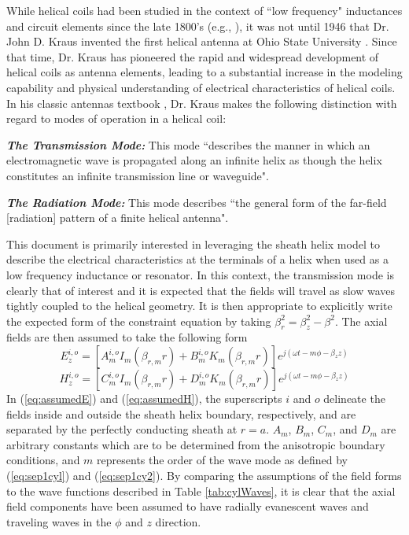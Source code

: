 While helical coils had been studied in the context of ``low frequency" inductances and circuit elements since the late 1800's (e.g., \cite{tesla1, pocklington}), it was not until 1946 that Dr. John D. Kraus invented the first helical antenna at Ohio State University \cite{kraus2}. Since that time, Dr. Kraus has pioneered the rapid and widespread development of helical coils as antenna elements, leading to a substantial increase in the modeling capability and physical understanding of electrical characteristics of helical coils. In his classic antennas textbook \cite{kraus2}, Dr. Kraus makes the following distinction with regard to modes of operation in a helical coil:

\hspace*{2em} \textit{\textbf{The Transmission Mode:}} This mode ``describes the manner in which an electromagnetic wave is propagated along an infinite helix as though the helix constitutes an infinite transmission line or waveguide".

\hspace*{2em} \textit{\textbf{The Radiation Mode:}} This mode describes ``the general form of the far-field [radiation] pattern of a finite helical antenna".

This document is primarily interested in leveraging the sheath helix model to describe the electrical characteristics at the terminals of a helix when used as a low frequency inductance or resonator. In this context, the transmission mode is clearly that of interest and it is expected that the fields will travel as slow waves tightly coupled to the helical geometry. It is then appropriate to explicitly write the expected form of the constraint equation by taking $\beta_{r}^2 = \beta_{z}^2 - \beta^2$. The axial fields are then assumed to take the following form 
\begin{equation}\label{eq:assumedE}
	E_{z}^{i,o} = [A_{m}^{i,o}I_{m}(\beta_{r,m}r) + B_{m}^{i,o}K_{m}(\beta_{r,m}r)]e^{j(\omega t - m\phi-\beta_{z}z)}
\end{equation}
\begin{equation}\label{eq:assumedH}
	H_{z}^{i,o} = [C_{m}^{i,o}I_{m}(\beta_{r,m}r) + D_{m}^{i,o}K_{m}(\beta_{r,m}r)]e^{j(\omega t - m\phi-\beta_{z}z)}
\end{equation}
In (\ref{eq:assumedE}) and (\ref{eq:assumedH}), the superscripts $i$ and $o$ delineate the fields inside and outside the sheath helix boundary, respectively, and are separated by the perfectly conducting sheath at $r=a$. $A_m$, $B_m$, $C_m$, and $D_m$ are arbitrary constants which are to be determined from the anisotropic boundary conditions, and $m$ represents the order of the wave mode as defined by (\ref{eq:sep1cyl}) and (\ref{eq:sep1cy2}). By comparing the assumptions of the field forms to the wave functions described in Table \ref{tab:cylWaves}, it is clear that the axial field components have been assumed to have radially evanescent waves and traveling waves in the $\phi$ and $z$ direction. 

